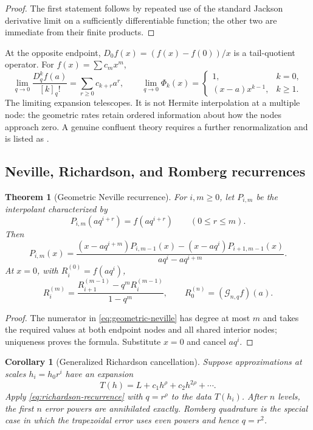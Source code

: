 \documentclass[11pt,a4paper,oneside]{article}
\newtheorem{theorem}{Theorem}[section]
\newtheorem{corollary}[corollary]{Corollary}
\theoremstyle{definition}
\theoremstyle{remark}
\newcommand{\Gop}{\mathcal G}
\begin{document}
\begin{proof}
The first statement follows by repeated use of the standard Jackson derivative
limit on a sufficiently differentiable function; the other two are immediate
from their finite products.
\end{proof}

At the opposite endpoint, $D_0f(x)=(f(x)-f(0))/x$ is a tail-quotient operator.
For $f(x)=\sum c_mx^m$,
\[
 \lim_{q\to0}\frac{D_q^kf(a)}{[k]_q!}
 =\sum_{r\ge0}c_{k+r}a^r,
 \qquad
 \lim_{q\to0}\Phi_k(x)=
 \begin{cases}
 1,&k=0,\\
 (x-a)x^{k-1},&k\ge1.
 \end{cases}
\]
The limiting expansion telescopes.  It is not Hermite interpolation at a
multiple node: the geometric rates retain ordered information about how the
nodes approach zero.  A genuine confluent theory requires a further
renormalization and is listed as .

\subsection{Neville, Richardson, and Romberg recurrences}

\begin{theorem}[Geometric Neville recurrence]
\label{thm:neville}
For $i,m\ge0$, let $P_{i,m}$ be the interpolant characterized by
\[
 P_{i,m}(aq^{i+r})=f(aq^{i+r})\qquad(0\le r\le m).
\]
Then
\begin{equation}
 P_{i,m}(x)=
 \frac{(x-aq^{i+m})P_{i,m-1}(x)
      -(x-aq^i)P_{i+1,m-1}(x)}
      {aq^i-aq^{i+m}}.
 \label{eq:geometric-neville}
\end{equation}
At $x=0$, with $R_i^{(0)}=f(aq^i)$,
\begin{equation}
 R_i^{(m)}
 =\frac{R_{i+1}^{(m-1)}-q^mR_i^{(m-1)}}{1-q^m},
 \qquad
 R_0^{(n)}=(\Gop_{n,q}f)(a).
 \label{eq:richardson-recurrence}
\end{equation}
\end{theorem}

\begin{proof}
The numerator in \eqref{eq:geometric-neville} has degree at most $m$ and takes
the required values at both endpoint nodes and all shared interior nodes;
uniqueness proves the formula.  Substitute $x=0$ and cancel $aq^i$.
\end{proof}

\begin{corollary}[Generalized Richardson cancellation]
\label{cor:richardson}
Suppose approximations at scales $h_i=h_0r^i$ have an expansion
\[
 T(h)=L+c_1h^\rho+c_2h^{2\rho}+\cdots.
\]
Apply \eqref{eq:richardson-recurrence} with $q=r^\rho$ to the data $T(h_i)$.
After $n$ levels, the first $n$ error powers are annihilated exactly.  Romberg
quadrature is the special case in which the trapezoidal error uses even powers
and hence $q=r^2$.
\end{corollary}
\end{document}
